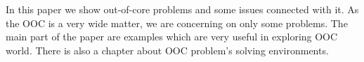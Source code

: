 	In this paper we show out-of-core problems and some issues connected with it.
	As the OOC is a very wide matter, we are concerning on only some problems. 
	The main part of the paper are examples which are very useful in exploring OOC world. 
	There is also a chapter about OOC problem's solving environments.

